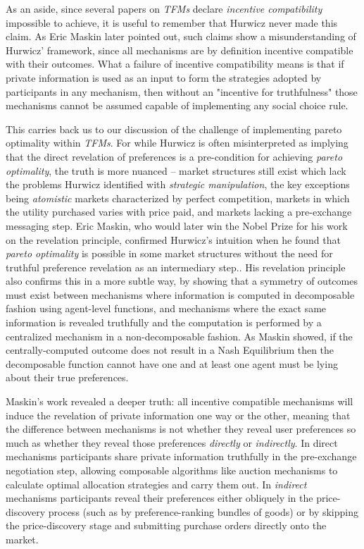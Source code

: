 As an aside, since several papers on \textit{TFMs} declare \textit{incentive compatibility} impossible to achieve, it is useful to remember that Hurwicz never made this claim. As Eric Maskin later pointed out, such claims show a misunderstanding of Hurwicz' framework, since all mechanisms are by definition incentive compatible with their outcomes. What a failure of incentive compatibility means is that if private information is used as an input to form the strategies adopted by participants in any mechanism, then without an "incentive for truthfulness" those mechanisms cannot be assumed capable of implementing any social choice rule.

This carries back us to our discussion of the challenge of implementing {pareto optimality} within \textit{TFMs}. For while Hurwicz is often misinterpreted as implying that the direct revelation of preferences is a pre-condition for achieving \textit{pareto optimality}, the truth is more nuanced -- market structures still exist which lack the problems Hurwicz identified with \textit{strategic manipulation}, the key exceptions being \textit{atomistic} markets characterized by perfect competition, markets in which the utility purchased varies with price paid, and markets lacking a pre-exchange messaging step. Eric Maskin, who would later win the Nobel Prize for his work on the revelation principle, confirmed Hurwicz's intuition when he found that \textit{pareto optimality} is possible in some market structures without the need for truthful preference revelation as an intermediary step.\citet{maskin1999nash}. His revelation principle also confirms this in a more subtle way, by showing that a symmetry of outcomes must exist between mechanisms where information is computed in decomposable fashion using agent-level functions, and mechanisms where the exact same information is revealed truthfully and the computation is performed by a centralized mechanism in a non-decomposable fashion. As Maskin showed, if the centrally-computed outcome does not result in a Nash Equilibrium then the decomposable function cannot have one and at least one agent must be lying about their true preferences.

Maskin's work revealed a deeper truth: all incentive compatible mechanisms will induce the revelation of private information one way or the other, meaning that the difference between mechanisms is not whether they reveal user preferences so much as whether they reveal those preferences \textit{directly} or \textit{indirectly}. In direct mechanisms participants share private information truthfully in the pre-exchange negotiation step, allowing composable algorithms like auction mechanisms to calculate optimal allocation strategies and carry them out. In \textit{indirect} mechanisms participants reveal their preferences either obliquely in the price-discovery process (such as by preference-ranking bundles of goods) or by skipping the price-discovery stage and submitting purchase orders directly onto the market.

